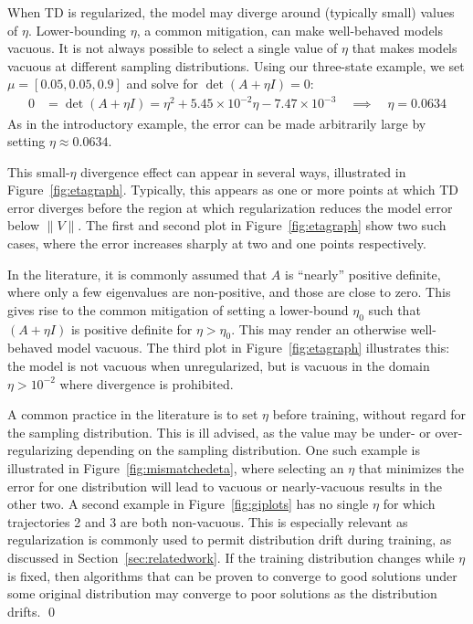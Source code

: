 \begin{example}\label{ex:badeta}
  When TD is regularized, the model may diverge around (typically small) values of $\eta$. Lower-bounding $\eta$, a common mitigation, can make well-behaved models vacuous. It is not always possible to select a single value of $\eta$ that makes models vacuous at different sampling distributions.
  \vspace{-1em}\proof
  Using our three-state example, we set $\mu=[0.05, 0.05, 0.9]$ and solve for $\det(A+\eta I)=0$:
  \begin{align}
    0 & = \det(A+\eta I) = \eta^2 + 5.45\times 10^{-2} \eta - 7.47\times 10^{-3}
    \quad\implies\quad  \eta = 0.0634
  \end{align}
  As in the introductory example, the error can be made arbitrarily large by setting $\eta\approx 0.0634$.

  This small-$\eta$ divergence effect can appear in several ways, illustrated in Figure~\ref{fig:etagraph}. Typically, this appears as one or more points at which TD error diverges before the region at which regularization reduces the model error below $\|V\|$. The first and second plot in Figure~\ref{fig:etagraph} show two such cases, where the error increases sharply at two and one points respectively.

  In the literature, it is commonly assumed that $A$ is ``nearly'' positive definite, where only a few eigenvalues are non-positive, and those are close to zero. This gives rise to the common mitigation of setting a lower-bound $\eta_0$ such that $(A+\eta I)$ is positive definite for $\eta>\eta_0$. This may render an otherwise well-behaved model vacuous. The third plot in Figure~\ref{fig:etagraph} illustrates this: the model is not vacuous when unregularized, but is vacuous in the domain $\eta > 10^{-2}$ where divergence is prohibited.

  A common practice in the literature is to set $\eta$ before training, without regard for the sampling distribution. This is ill advised, as the value may be under- or over-regularizing depending on the sampling distribution. One such example is illustrated in Figure~\ref{fig:mismatchedeta}, where selecting an $\eta$ that minimizes the error for one distribution will lead to vacuous or nearly-vacuous results in the other two. A second example in Figure~\ref{fig:giplots} has no single $\eta$ for which trajectories 2 and 3 are both non-vacuous. This is especially relevant as regularization is commonly used to permit distribution drift during training, as discussed in Section~\ref{sec:relatedwork}. If the training distribution changes while $\eta$ is fixed, then algorithms that can be proven to converge to good solutions under some original distribution may converge to poor solutions as the distribution drifts.
  \qed
\end{example}


